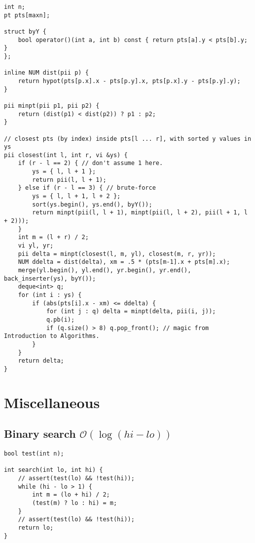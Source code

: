 \documentclass{article}
\begin{document}
\begin{lstlisting}
int n;
pt pts[maxn];

struct byY {
	bool operator()(int a, int b) const { return pts[a].y < pts[b].y; }
};

inline NUM dist(pii p) {
	return hypot(pts[p.x].x - pts[p.y].x, pts[p.x].y - pts[p.y].y);
}

pii minpt(pii p1, pii p2) {
	return (dist(p1) < dist(p2)) ? p1 : p2;
}

// closest pts (by index) inside pts[l ... r], with sorted y values in ys
pii closest(int l, int r, vi &ys) {
	if (r - l == 2) { // don't assume 1 here.
		ys = { l, l + 1 };
		return pii(l, l + 1);
	} else if (r - l == 3) { // brute-force
		ys = { l, l + 1, l + 2 };
		sort(ys.begin(), ys.end(), byY());
		return minpt(pii(l, l + 1), minpt(pii(l, l + 2), pii(l + 1, l + 2)));
	}
	int m = (l + r) / 2;
	vi yl, yr;
	pii delta = minpt(closest(l, m, yl), closest(m, r, yr));
	NUM ddelta = dist(delta), xm = .5 * (pts[m-1].x + pts[m].x);
	merge(yl.begin(), yl.end(), yr.begin(), yr.end(), back_inserter(ys), byY());
	deque<int> q;
	for (int i : ys) {
		if (abs(pts[i].x - xm) <= ddelta) {
			for (int j : q) delta = minpt(delta, pii(i, j));
			q.pb(i);
			if (q.size() > 8) q.pop_front(); // magic from Introduction to Algorithms.
		}
	}
	return delta;
}
\end{lstlisting}

\section{Miscellaneous}
\subsection{Binary search $\mathcal{O}(\log (hi - lo))$}

\begin{lstlisting}
bool test(int n);

int search(int lo, int hi) {
	// assert(test(lo) && !test(hi));
	while (hi - lo > 1) {
		int m = (lo + hi) / 2;
		(test(m) ? lo : hi) = m;
	}
	// assert(test(lo) && !test(hi));
	return lo;
}
\end{lstlisting}

\begin{comment}
\end{minipage}\hfill
\begin{minipage}{.45\textwidth}
	\begin{lstlisting}[title={Inclusive, Inclusive}]
bool test(int n);
	
int lo = 0, hi = n - 1;
// assert(test(lo) && !test(hi + 1));
while (lo < hi) {
	int mid = (lo + hi + 1) / 2;
	if (test(mid)) lo = mid;
	else hi = mid - 1;
}
return lo;
	\end{lstlisting}
\end{minipage}
\end{comment}
\end{document}
